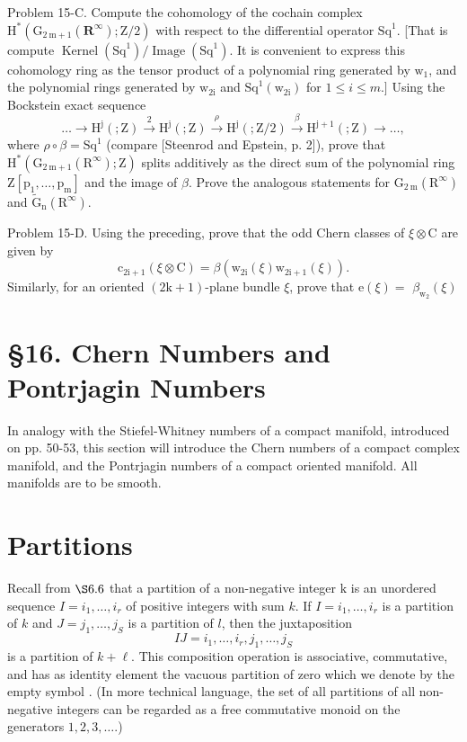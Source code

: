 \documentclass[10pt]{article}
\begin{document}
Problem 15-C. Compute the cohomology of the cochain complex $\mathrm{H}^{*}\left(\mathrm{G}_{2 \mathrm{~m}+1}\left(\mathbf{R}^{\infty}\right) ; \mathrm{Z} / 2\right)$ with respect to the differential operator $\mathrm{Sq}^{1}$. [That is compute $\operatorname{Kernel}\left(\mathrm{Sq}^{1}\right) / \operatorname{Image}\left(\mathrm{Sq}^{1}\right)$. It is convenient to express this cohomology ring as the tensor product of a polynomial ring generated by $\mathrm{w}_{1}$, and the polynomial rings generated by $\mathrm{w}_{2 \mathrm{i}}$ and $\mathrm{Sq}^{1}\left(\mathrm{w}_{2 \mathrm{i}}\right)$ for $1 \leq i \leq m .]$ Using the Bockstein exact sequence
$$
\ldots \longrightarrow \mathrm{H}^{\mathrm{j}}(; \mathrm{Z}) \stackrel{2}{\longrightarrow} \mathrm{H}^{\mathrm{j}}(; \mathrm{Z}) \stackrel{\rho}{\longrightarrow} \mathrm{H}^{\mathrm{j}}(; \mathrm{Z} / 2) \stackrel{\beta}{\longrightarrow} \mathrm{H}^{\mathrm{j}+1}(; \mathrm{Z}) \longrightarrow \ldots,
$$
where $\rho \circ \beta=\mathrm{Sq}^{1}$ (compare [Steenrod and Epstein, p. 2]), prove that $\mathrm{H}^{*}\left(\mathrm{G}_{2 \mathrm{~m}+1}\left(\mathrm{R}^{\infty}\right) ; \mathrm{Z}\right)$ splits additively as the direct sum of the polynomial ring $\mathrm{Z}\left[\mathrm{p}_{1}, \ldots, \mathrm{p}_{\mathrm{m}}\right]$ and the image of $\beta$. Prove the analogous statements for $\mathrm{G}_{2 \mathrm{~m}}\left(\mathrm{R}^{\infty}\right)$ and $\tilde{\mathrm{G}}_{\mathrm{n}}\left(\mathrm{R}^{\infty}\right)$.

Problem 15-D. Using the preceding, prove that the odd Chern classes of $\xi \otimes \mathrm{C}$ are given by
$$
\mathrm{c}_{2 \mathrm{i}+1}(\xi \otimes \mathrm{C})=\beta\left(\mathrm{w}_{2 \mathrm{i}}(\xi) \mathrm{w}_{2 \mathrm{i}+1}(\xi)\right) .
$$
Similarly, for an oriented $(2 \mathrm{k}+1)$-plane bundle $\xi$, prove that $\mathrm{e}(\xi)=$ $\beta_{\mathrm{w}_{2}}(\xi)$

\section{§16. Chern Numbers and Pontrjagin Numbers}
In analogy with the Stiefel-Whitney numbers of a compact manifold, introduced on pp. 50-53, this section will introduce the Chern numbers of a compact complex manifold, and the Pontrjagin numbers of a compact oriented manifold. All manifolds are to be smooth.

\section{Partitions}
Recall from $\S 6.6$ that a partition of a non-negative integer $\mathrm{k}$ is an unordered sequence $I=i_{1}, \ldots, i_{r}$ of positive integers with sum $k$. If $I=i_{1}, \ldots, i_{r}$ is a partition of $k$ and $J=j_{1}, \ldots, j_{S}$ is a partition of $l$, then the juxtaposition
$$
I J=i_{1}, \ldots, i_{r}, j_{1}, \ldots, j_{S}
$$
is a partition of $k+\ell$. This composition operation is associative, commutative, and has as identity element the vacuous partition of zero which we denote by the empty symbol . (In more technical language, the set of all partitions of all non-negative integers can be regarded as a free commutative monoid on the generators $1,2,3, \ldots$.)
\end{document}
